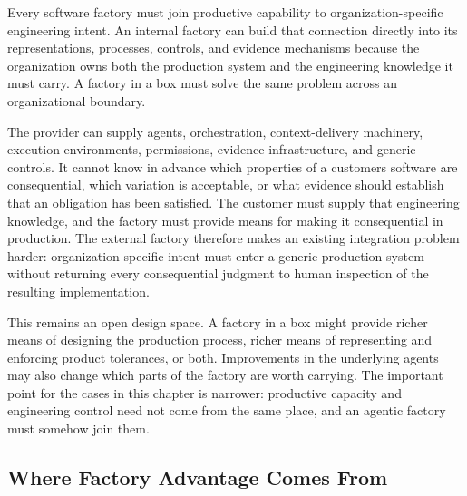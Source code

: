 Every software factory must join productive capability to organization-specific engineering intent. An internal factory can build that connection directly into its representations, processes, controls, and evidence mechanisms because the organization owns both the production system and the engineering knowledge it must carry. A factory in a box must solve the same problem across an organizational boundary.


The provider can supply agents, orchestration, context-delivery machinery, execution environments, permissions, evidence infrastructure, and generic controls. It cannot know in advance which properties of a customer\textquotesingle s software are consequential, which variation is acceptable, or what evidence should establish that an obligation has been satisfied. The customer must supply that engineering knowledge, and the factory must provide means for making it consequential in production. The external factory therefore makes an existing integration problem harder: organization-specific intent must enter a generic production system without returning every consequential judgment to human inspection of the resulting implementation.


This remains an open design space. A factory in a box might provide richer means of designing the production process, richer means of representing and enforcing product tolerances, or both. Improvements in the underlying agents may also change which parts of the factory are worth carrying. The important point for the cases in this chapter is narrower: productive capacity and engineering control need not come from the same place, and an agentic factory must somehow join them.

\subsection{Where Factory Advantage Comes From}\label{heading:where-factory-advantage-comes-from}

